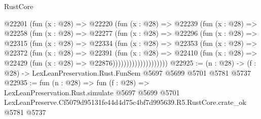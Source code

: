 \begin{lexlean}{RustCore}
\begin{coremodule}
                @22201
                  (fun (x : @28) =>
                  @22220
                    (fun (x : @28) =>
                    @22239
                      (fun (x : @28) =>
                      @22258
                        (fun (x : @28) =>
                        @22277
                          (fun (x : @28) =>
                          @22296
                            (fun (x : @28) =>
                            @22315
                              (fun (x : @28) =>
                              @22334
                                (fun (x : @28) =>
                                @22353
                                  (fun (x : @28) =>
                                  @22372
                                    (fun (x : @28) =>
                                    @22391
                                      (fun (x : @28) =>
                                      @22410
                                        (fun (x : @28) =>
                                        @22429 (fun (x : @28) => @22876))))))))))))))))))))
@22925 := (n : @28) -> (f : @28) -> LexLeanPreservation.Rust.FunSem @5697 @5699 @5701 @5781 @5737
@22935 := fun (n : @28) =>
  fun (f : @28) =>
  LexLeanPreservation.Rust.simulate
    @5697
    @5699
    @5701
    LexLeanPreserve.Cf5079d95131fe44d4d75c4bf7d995639.R5.RustCore.crate_ok
    @5781
    @5737
\end{coremodule}
\end{lexlean}
